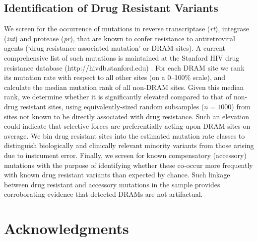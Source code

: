 \documentclass[10pt]{article}
\begin{document}
\subsection*{Identification of Drug Resistant Variants}
We screen for the occurrence of mutations in reverse transcriptase (\textit{rt}), integrase (\textit{int}) and protease (\textit{pr}),
that are known to confer resistance to antiretroviral agents (`drug resistance associated mutation' or DRAM sites).
A current comprehensive list of such mutations is maintained at the Stanford HIV drug resistance database (http://hivdb.stanford.edu) \cite{Shafer2006}.
For each DRAM site we rank its mutation rate with respect to all other sites (on a 0--100\% scale),
and calculate the median mutation rank of all non-DRAM sites.
Given this median rank, we determine whether it is significantly elevated compared to that of non-drug resistant sites,
using equivalently-sized random subsamples ($n=1000$) from sites not known to be directly associated with drug resistance.
Such an elevation could indicate that selective forces are preferentially acting upon DRAM sites on average.
We bin drug resistant sites into the estimated mutation rate classes to distinguish biologically and clinically relevant minority variants
from those arising due to instrument error.
Finally, we screen for known compensatory (accessory) mutations
with the purpose of identifying whether these co-occur more frequently with known drug resistant variants than expected by chance.
Such linkage between drug resistant and accessory mutations in the sample provides corroborating evidence that detected DRAMs are not artifactual.

\section*{Acknowledgments}



\end{document}
